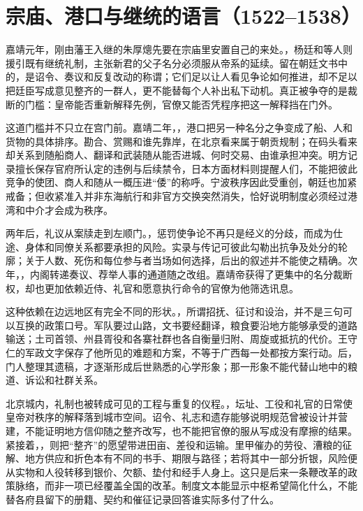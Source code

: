 \section{宗庙、港口与继统的语言（1522--1538）}

嘉靖元年，刚由藩王入继的朱厚熜先要在宗庙里安置自己的来处。，杨廷和等人则援引既有继统礼制，主张新君的父子名分必须服从帝系的延续。留在朝廷文书中的，是诏令、奏议和反复改动的称谓；它们足以让人看见争论如何推进，却不足以把廷臣写成意见整齐的一群人，更不能替每个人补出私下动机。真正被争夺的是裁断的门槛：皇帝能否重新解释先例，官僚又能否凭程序把这一解释挡在门外。

这道门槛并不只立在宫门前。嘉靖二年，，港口把另一种名分之争变成了船、人和货物的具体排序。勘合、赏赐和谁先靠岸，在北京看来属于朝贡规制；在码头看来却关系到随船商人、翻译和武装随从能否进城、何时交易、由谁承担冲突。明方记录擅长保存官府所认定的违例与后续禁令，日本方面材料则提醒人们，不能把彼此竞争的使团、商人和随从一概压进“倭”的称呼。宁波秩序因此受重创，朝廷也加紧戒备；但收紧准入并非东海航行和非官方交换突然消失，恰好说明制度必须经过港湾和中介才会成为秩序。

两年后，礼议从案牍走到左顺门。，惩罚使争论不再只是经义的分歧，而成为仕途、身体和同僚关系都要承担的风险。实录与传记可彼此勾勒出抗争及处分的轮廓；关于人数、死伤和每位参与者当场如何选择，后出的叙述并不能使之精确。次年，，内阁转递奏议、荐举人事的通道随之改组。嘉靖帝获得了更集中的名分裁断权，却也更加依赖近侍、礼官和愿意执行命令的官僚为他筛选讯息。

这种依赖在边远地区有完全不同的形状。，所谓招抚、征讨和设治，并不是三句可以互换的政策口号。军队要过山路，文书要经翻译，粮食要沿地方能够承受的道路输送；土司首领、州县胥役和各寨社群也各自衡量归附、周旋或抵抗的代价。王守仁的军政文字保存了他所见的难题和方案，不等于广西每一处都按方案行动。后，门人整理其遗稿，才逐渐形成后世熟悉的心学形象；那一形象不能代替山地中的粮道、诉讼和社群关系。

北京城内，礼制也被转成可见的工程与重复的仪程。，坛址、工役和礼官的日常使皇帝对秩序的解释落到城市空间。诏令、礼志和遗存能够说明规范曾被设计并营建，不能证明地方信仰随之整齐改写，也不能把官僚的服从写成没有摩擦的结果。紧接着，，则把“整齐”的愿望带进田亩、差役和运输。里甲催办的劳役、漕粮的征解、地方供应和折色本有不同的书手、期限与路径；若将其中一部分折银，风险便从实物和人役转移到银价、欠额、垫付和经手人身上。这只是后来一条鞭改革的政策脉络，而非一项已经覆盖全国的改革。制度文本能显示中枢希望简化什么，不能替各府县留下的册籍、契约和催征记录回答谁实际多付了什么。


